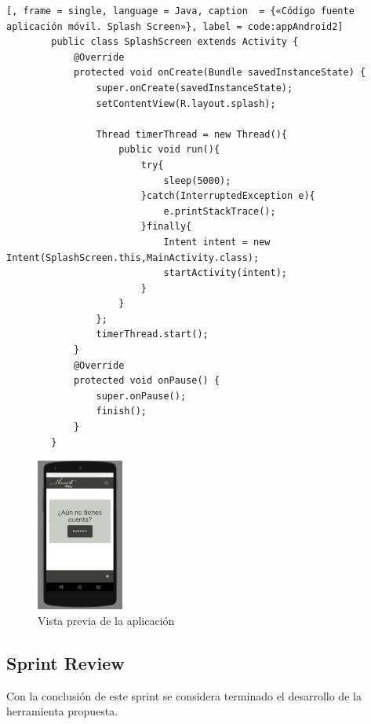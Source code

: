 		\begin{lstlisting}[, frame = single, language = Java, caption  = {«Código fuente aplicación móvil. Splash Screen»}, label = code:appAndroid2]
		public class SplashScreen extends Activity {
		    @Override
		    protected void onCreate(Bundle savedInstanceState) {
		        super.onCreate(savedInstanceState);
		        setContentView(R.layout.splash);
		
		        Thread timerThread = new Thread(){
		            public void run(){
		                try{
		                    sleep(5000);
		                }catch(InterruptedException e){
		                    e.printStackTrace();
		                }finally{
		                    Intent intent = new Intent(SplashScreen.this,MainActivity.class);
		                    startActivity(intent);
		                }
		            }
		        };
		        timerThread.start();
		    }
		    @Override
		    protected void onPause() {
		        super.onPause();
		        finish();
		    }
		}
	\end{lstlisting}
	
	\begin{figure}[H]
		\centering
		\includegraphics[height=5cm, fbox={\fboxrule} 4mm]{images/05-resultados/25-app_Android.png}
		\caption{Vista previa de la aplicación}
		\label{fig:app-Android}
	\end{figure}
			
	\subsection{Sprint Review}
Con la conclusión de este sprint se considera terminado el desarrollo de la herramienta propuesta.
	
